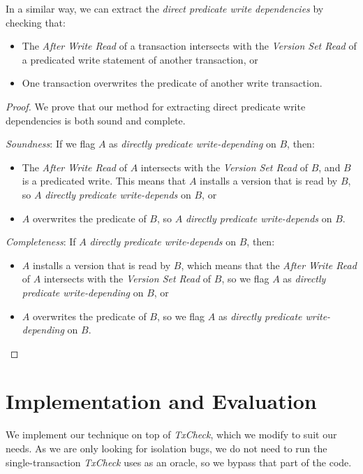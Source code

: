 In a similar way, we can extract the \textit{direct predicate write dependencies} by checking that:
\begin{itemize}
    \item The \textit{After Write Read} of a transaction intersects with the \textit{Version Set Read} of a predicated write statement of another transaction, or
    \item One transaction overwrites the predicate of another write transaction.
\end{itemize}

\begin{proof}
    We prove that our method for extracting direct predicate write dependencies is both sound and complete.

    \textit{Soundness}: If we flag $A$ as \textit{directly predicate write-depending} on $B$, then:
    \begin{itemize}
        \item The \textit{After Write Read} of $A$ intersects with the \textit{Version Set Read} of $B$, and $B$ is a predicated write. This means that $A$ installs a version that is read by $B$, so $A$ \textit{directly predicate write-depends} on $B$, or
        \item $A$ overwrites the predicate of $B$, so $A$ \textit{directly predicate write-depends} on $B$.
    \end{itemize}

    \textit{Completeness}: If $A$ \textit{directly predicate write-depends} on $B$, then:
    \begin{itemize}
        \item $A$ installs a version that is read by $B$, which means that the \textit{After Write Read} of $A$ intersects with the \textit{Version Set Read} of $B$, so we flag $A$ as \textit{directly predicate write-depending} on $B$, or
        \item $A$ overwrites the predicate of $B$, so we flag $A$ as \textit{directly predicate write-depending} on $B$.
    \end{itemize}
\end{proof}

\section{Implementation and Evaluation}

We implement our technique on top of \textit{TxCheck}, which we modify to suit our needs. As we are only looking for isolation bugs, we do not need to run the single-transaction \textit{TxCheck} uses as an oracle, so we bypass that part of the code.


